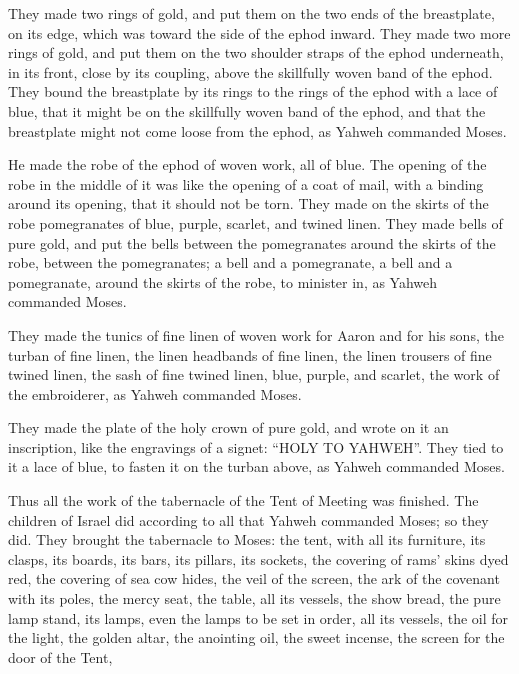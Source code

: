 {They made two rings of gold, and put them on the two ends of the breastplate, on its edge, which was toward the side of the ephod inward.
They made two more rings of gold, and put them on the two shoulder straps of the ephod underneath, in its front, close by its coupling, above the skillfully woven band of the ephod.
They bound the breastplate by its rings to the rings of the ephod with a lace of blue, that it might be on the skillfully woven band of the ephod, and that the breastplate might not come loose from the ephod, as Yahweh commanded Moses.
\par }{\PP {}He made the robe of the ephod of woven work, all of blue.
The opening of the robe in the middle of it was like the opening of a coat of mail, with a binding around its opening, that it should not be torn.
They made on the skirts of the robe pomegranates of blue, purple, scarlet, and twined linen.
They made bells of pure gold, and put the bells between the pomegranates around the skirts of the robe, between the pomegranates;
a bell and a pomegranate, a bell and a pomegranate, around the skirts of the robe, to minister in, as Yahweh commanded Moses.
\par }{\PP {}They made the tunics of fine linen of woven work for Aaron and for his sons,
the turban of fine linen, the linen headbands of fine linen, the linen trousers of fine twined linen,
the sash of fine twined linen, blue, purple, and scarlet, the work of the embroiderer, as Yahweh commanded Moses.
\par }{\PP {}They made the plate of the holy crown of pure gold, and wrote on it an inscription, like the engravings of a signet: “HOLY TO YAHWEH”.
They tied to it a lace of blue, to fasten it on the turban above, as Yahweh commanded Moses.
\par }{\PP {}Thus all the work of the tabernacle of the Tent of Meeting was finished. The children of Israel did according to all that Yahweh commanded Moses; so they did.
They brought the tabernacle to Moses: the tent, with all its furniture, its clasps, its boards, its bars, its pillars, its sockets,
the covering of rams’ skins dyed red, the covering of sea cow hides, the veil of the screen,
the ark of the covenant with its poles, the mercy seat,
the table, all its vessels, the show bread,
the pure lamp stand, its lamps, even the lamps to be set in order, all its vessels, the oil for the light,
the golden altar, the anointing oil, the sweet incense, the screen for the door of the Tent,
}
